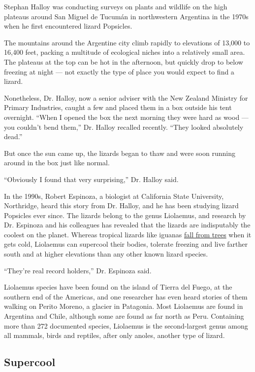 Stephan Halloy was conducting surveys on plants and wildlife on the high
plateaus around San Miguel de Tucumán in northwestern Argentina in the
1970s when he first encountered lizard Popsicles.

The mountains around the Argentine city climb rapidly to elevations of
13,000 to 16,400 feet, packing a multitude of ecological niches into a
relatively small area. The plateaus at the top can be hot in the
afternoon, but quickly drop to below freezing at night --- not exactly
the type of place you would expect to find a lizard.

Nonetheless, Dr. Halloy, now a senior adviser with the New Zealand
Ministry for Primary Industries, caught a few and placed them in a box
outside his tent overnight. ``When I opened the box the next morning
they were hard as wood --- you couldn't bend them,'' Dr. Halloy recalled
recently. ``They looked absolutely dead.''

But once the sun came up, the lizards began to thaw and were soon
running around in the box just like normal.

``Obviously I found that very surprising,'' Dr. Halloy said.

In the 1990s, Robert Espinoza, a biologist at California State
University, Northridge, heard this story from Dr. Halloy, and he has
been studying lizard Popsicles ever since. The lizards belong to the
genus Liolaemus, and research by Dr. Espinoza and his colleagues has
revealed that the lizards are indisputably the coolest on the planet.
Whereas tropical lizards like iguanas
\href{https://www.nytimes3xbfgragh.onion/2020/01/21/us/frozen-iguanas-miami-weather.html}{fall
from trees} when it gets cold, Liolaemus can supercool their bodies,
tolerate freezing and live farther south and at higher elevations than
any other known lizard species.

``They're real record holders,'' Dr. Espinoza said.

Liolaemus species have been found on the island of Tierra del Fuego, at
the southern end of the Americas, and one researcher has even heard
stories of them walking on Perito Moreno, a glacier in Patagonia. Most
Liolaemus are found in Argentina and Chile, although some are found as
far north as Peru. Containing more than 272 documented species,
Liolaemus is the second-largest genus among all mammals, birds and
reptiles, after only anoles, another type of lizard.

\hypertarget{supercool}{%
\subsection{Supercool}\label{supercool}}

